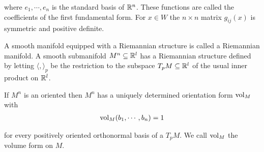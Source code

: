 where $e_1, \cdots, e_n$ is the standard basis of $\mathbb{R}^n$. These functions are called the
coefficients of the first fundamental form. For $x\in W$ the $n\times n$ matrix $g_{ij}(x)$
is symmetric and positive definite.

A smooth manifold equipped with a Riemannian structure is called a Riemannian
manifold. A smooth submanifold $M^n\subseteq\mathbb{R}^l$ has a Riemannian structure defined
by letting $\langle , \rangle_p$ be the restriction to the subspace $T_pM\subseteq \mathbb{R}^l$ of 
the usual inner product on $\mathbb{R}^l$.

\begin{proposition}\label{prop:9-16}
  If $M^n$ is an oriented  then $M^n$ has a uniquely determined orientation 
  form $\mathrm{vol}_M$ with 
  \begin{align*}
    \mathrm{vol}_M (b_1, \cdots, b_n) = 1
  \end{align*}

  for every positively oriented orthonormal basis of a  $T_pM$. We call
  $\mathrm{vol}_M$ the volume form on $M$.
\end{proposition}

